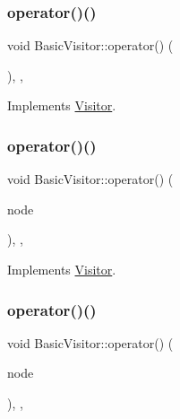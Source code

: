 \subsubsection{\texorpdfstring{operator()()}{operator()()}\hspace{0.1cm}{\footnotesize\ttfamily [10/60]}}
{\footnotesize\ttfamily void Basic\+Visitor\+::operator() (\begin{DoxyParamCaption}\item[{const \hyperlink{struct_this_expression}{This\+Expression} \&}]{ }\end{DoxyParamCaption})\hspace{0.3cm}{\ttfamily [inline]}, {\ttfamily [override]}, {\ttfamily [virtual]}}



Implements \hyperlink{struct_visitor_ae8eb5856c0ed7ff4840fa9045c886f59}{Visitor}.

\mbox{\label{struct_basic_visitor_a453bc258129808d4e1e1efefcfa893a0}} 
\subsubsection{\texorpdfstring{operator()()}{operator()()}\hspace{0.1cm}{\footnotesize\ttfamily [11/60]}}
{\footnotesize\ttfamily void Basic\+Visitor\+::operator() (\begin{DoxyParamCaption}\item[{const \hyperlink{struct_identifier_expression}{Identifier\+Expression} \&}]{node }\end{DoxyParamCaption})\hspace{0.3cm}{\ttfamily [inline]}, {\ttfamily [override]}, {\ttfamily [virtual]}}



Implements \hyperlink{struct_visitor_ad804ffa8c84a6fa58b18980cd3ec71af}{Visitor}.

\mbox{\label{struct_basic_visitor_af86e1dfc1fb346b3dd94a63b6017f4d4}} 
\subsubsection{\texorpdfstring{operator()()}{operator()()}\hspace{0.1cm}{\footnotesize\ttfamily [12/60]}}
{\footnotesize\ttfamily void Basic\+Visitor\+::operator() (\begin{DoxyParamCaption}\item[{const \hyperlink{struct_literal_expression}{Literal\+Expression} \&}]{node }\end{DoxyParamCaption})\hspace{0.3cm}{\ttfamily [inline]}, {\ttfamily [override]}, {\ttfamily [virtual]}}



